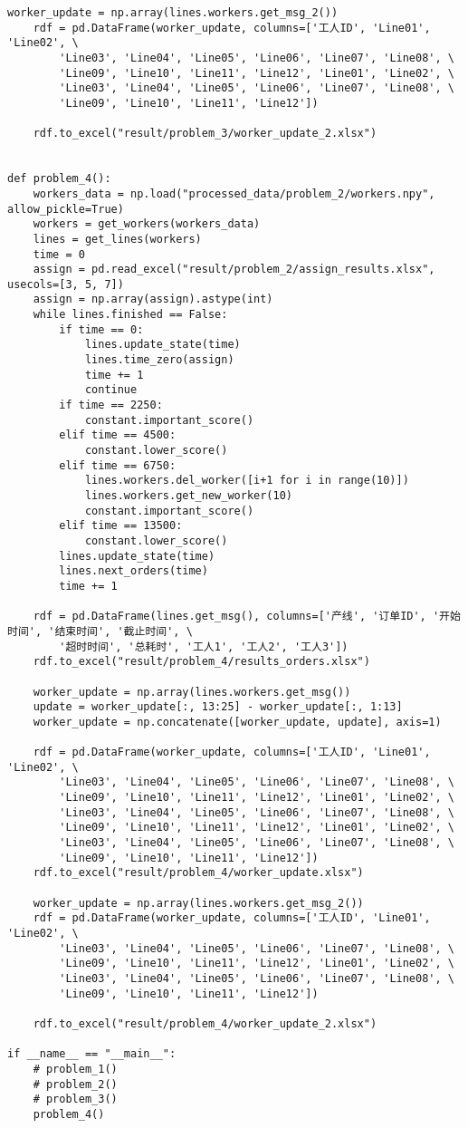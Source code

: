 \begin{lstlisting}[caption={问题解决}, label={lst:python}]
    worker_update = np.array(lines.workers.get_msg_2())
    rdf = pd.DataFrame(worker_update, columns=['工人ID', 'Line01', 'Line02', \
        'Line03', 'Line04', 'Line05', 'Line06', 'Line07', 'Line08', \
        'Line09', 'Line10', 'Line11', 'Line12', 'Line01', 'Line02', \
        'Line03', 'Line04', 'Line05', 'Line06', 'Line07', 'Line08', \
        'Line09', 'Line10', 'Line11', 'Line12'])
    
    rdf.to_excel("result/problem_3/worker_update_2.xlsx")


def problem_4():
    workers_data = np.load("processed_data/problem_2/workers.npy", allow_pickle=True)
    workers = get_workers(workers_data)
    lines = get_lines(workers)
    time = 0
    assign = pd.read_excel("result/problem_2/assign_results.xlsx", usecols=[3, 5, 7])
    assign = np.array(assign).astype(int)
    while lines.finished == False:  
        if time == 0:
            lines.update_state(time)
            lines.time_zero(assign)
            time += 1
            continue
        if time == 2250:
            constant.important_score()
        elif time == 4500:
            constant.lower_score()
        elif time == 6750:
            lines.workers.del_worker([i+1 for i in range(10)])
            lines.workers.get_new_worker(10)
            constant.important_score()
        elif time == 13500:
            constant.lower_score()
        lines.update_state(time)
        lines.next_orders(time)
        time += 1 

    rdf = pd.DataFrame(lines.get_msg(), columns=['产线', '订单ID', '开始时间', '结束时间', '截止时间', \
        '超时时间', '总耗时', '工人1', '工人2', '工人3'])
    rdf.to_excel("result/problem_4/results_orders.xlsx")
    
    worker_update = np.array(lines.workers.get_msg())
    update = worker_update[:, 13:25] - worker_update[:, 1:13]
    worker_update = np.concatenate([worker_update, update], axis=1)
    
    rdf = pd.DataFrame(worker_update, columns=['工人ID', 'Line01', 'Line02', \
        'Line03', 'Line04', 'Line05', 'Line06', 'Line07', 'Line08', \
        'Line09', 'Line10', 'Line11', 'Line12', 'Line01', 'Line02', \
        'Line03', 'Line04', 'Line05', 'Line06', 'Line07', 'Line08', \
        'Line09', 'Line10', 'Line11', 'Line12', 'Line01', 'Line02', \
        'Line03', 'Line04', 'Line05', 'Line06', 'Line07', 'Line08', \
        'Line09', 'Line10', 'Line11', 'Line12'])
    rdf.to_excel("result/problem_4/worker_update.xlsx")
    
    worker_update = np.array(lines.workers.get_msg_2())
    rdf = pd.DataFrame(worker_update, columns=['工人ID', 'Line01', 'Line02', \
        'Line03', 'Line04', 'Line05', 'Line06', 'Line07', 'Line08', \
        'Line09', 'Line10', 'Line11', 'Line12', 'Line01', 'Line02', \
        'Line03', 'Line04', 'Line05', 'Line06', 'Line07', 'Line08', \
        'Line09', 'Line10', 'Line11', 'Line12'])
    
    rdf.to_excel("result/problem_4/worker_update_2.xlsx")

if __name__ == "__main__":
    # problem_1()
    # problem_2()
    # problem_3()
    problem_4()
\end{lstlisting}